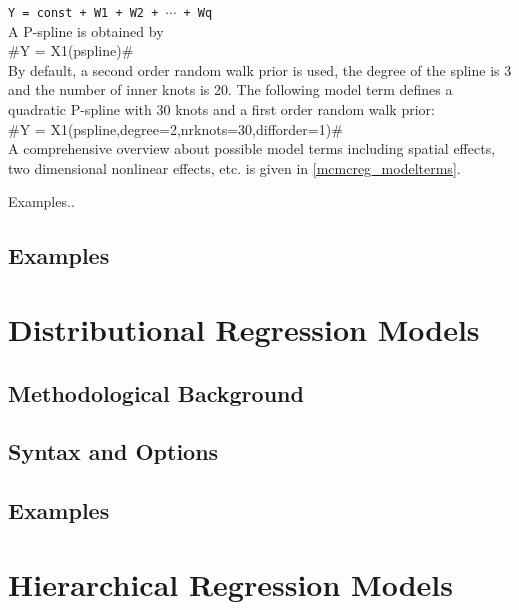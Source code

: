 \texttt{Y = const + W1 + W2 + $\cdots$ + Wq} \\

A P-spline is obtained by \\

#Y = X1(pspline)# \\

By default, a second order random walk prior is used, the degree of the spline is 3 and the number of inner
knots is 20. The following model term defines a quadratic P-spline
with 30 knots and a first order random walk prior: \\

#Y = X1(pspline,degree=2,nrknots=30,difforder=1)# \\



A comprehensive overview about  possible model terms including 
spatial effects, two dimensional nonlinear effects, etc. is given in \autoref{mcmcreg_modelterms}.


Examples..









 

\subsection{Examples}

\section{Distributional Regression Models}

\subsection{Methodological Background}

\subsection{Syntax and Options}

\subsection{Examples}

\section{Hierarchical Regression Models}

